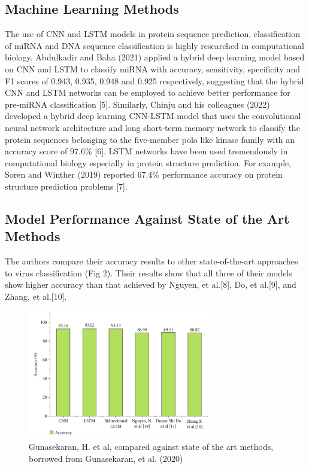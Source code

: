 \documentclass[journal]{IEEEtran}
\begin{document}
  \subsection{Machine Learning Methods}
    The use of CNN and LSTM models in protein sequence prediction, classification of miRNA and DNA sequence classification is
    highly researched in computational biology. Abdulkadir and Baha (2021) applied a hybrid deep learning model based on
    CNN and LSTM to classify miRNA with accuracy, sensitivity, specificity and F1 scores of 0.943, 0.935, 0.948 and 0.925 respectively,
    suggesting that the hybrid CNN and LSTM networks can be employed to achieve better performance for pre-miRNA classification [5].
    Similarly, Chinju and his colleagues (2022) developed a hybrid deep learning CNN-LSTM model that uses the
    convolutional neural network architecture and long short-term memory network to classify the protein sequences belonging to
    the five-member polo like kinase family with an accuracy score of 97.6\% [6].
    LSTM networks have been used tremendously in computational biology especially in protein structure prediction.
    For example, Soren and Winther (2019) reported 67.4\% performance accuracy on protein structure prediction problems [7].

\subsection{Model Performance Against State of the Art Methods}

  The authors compare their accuracy results to other state-of-the-art approaches to
  virus classification (Fig 2). Their results show that all three of their models show higher accuracy than
  that achieved by Nguyen, et al.[8], Do, et al.[9], and Zhang, et al.[10].

  \begin{figure}
    \centering
    \includegraphics[width=8cm]{figures/accuracy_compared_to_state_of_art.png}
    \caption{Gunasekaran, H. et al, compared against state of the art methods, borrowed from Gunasekaran, et al. (2020)}
  \end{figure}
\end{document}
